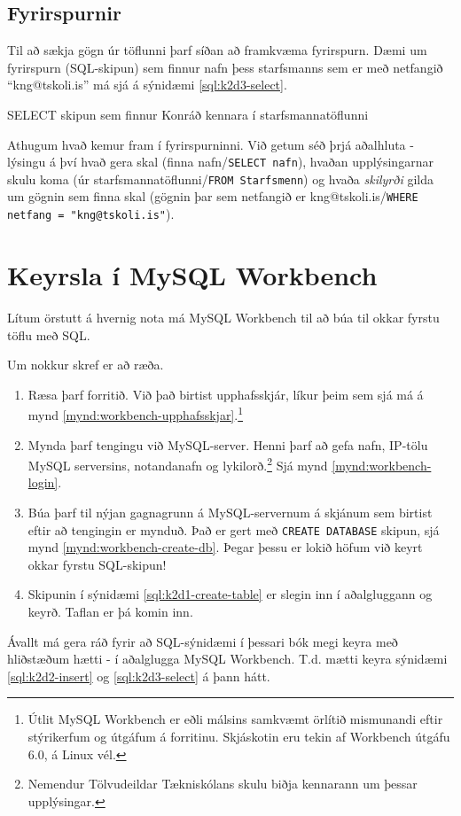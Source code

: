 \subsection{Fyrirspurnir}
Til að sækja gögn úr töflunni þarf síðan að framkvæma fyrirspurn. Dæmi um fyrirspurn (SQL-skipun) sem finnur nafn þess starfsmanns sem er með netfangið ``kng@tskoli.is'' má sjá á sýnidæmi \ref{sql:k2d3-select}.

\begin{example}[h]
\caption{SELECT skipun sem finnur Konráð kennara í starfsmannatöflunni}
\label{sql:k2d3-select}
\centering
{}
\end{example}

Athugum hvað kemur fram í fyrirspurninni. Við getum séð þrjá aðalhluta - lýsingu á því hvað gera skal (finna nafn/\verb|SELECT nafn|), hvaðan upplýsingarnar skulu koma (úr starfsmannatöflunni/\verb|FROM Starfsmenn|) og hvaða \emph{skilyrði} gilda um gögnin sem finna skal (gögnin þar sem netfangið er kng@tskoli.is/\verb|WHERE netfang = "kng@tskoli.is"|). 

\section{Keyrsla í MySQL Workbench}
\label{undirkafli:keyrslaiworkbench}
Lítum örstutt á hvernig nota má MySQL Workbench til að búa til okkar fyrstu töflu með SQL.

Um nokkur skref er að ræða.
\begin{enumerate}
 \item Ræsa þarf forritið. Við það birtist upphafsskjár, líkur þeim sem sjá má á mynd \ref{mynd:workbench-upphafsskjar}.\footnote{Útlit MySQL Workbench er eðli málsins samkvæmt örlítið mismunandi eftir stýrikerfum og útgáfum á forritinu. Skjáskotin eru tekin af Workbench útgáfu 6.0, á Linux vél.}
 \item Mynda þarf tengingu við MySQL-server. Henni þarf að gefa nafn, IP-tölu MySQL serversins, notandanafn og lykilorð.\footnote{Nemendur Tölvudeildar Tækniskólans skulu biðja kennarann um þessar upplýsingar.} Sjá mynd \ref{mynd:workbench-login}.
 \item Búa þarf til nýjan gagnagrunn á MySQL-servernum á skjánum sem birtist eftir að tengingin er mynduð. Það er gert með \verb|CREATE DATABASE| skipun, sjá mynd \ref{mynd:workbench-create-db}. Þegar þessu er lokið höfum við keyrt okkar fyrstu SQL-skipun!
 \item Skipunin í sýnidæmi \ref{sql:k2d1-create-table} er slegin inn í aðalgluggann og keyrð. Taflan er þá komin inn.
\end{enumerate}
Ávallt má gera ráð fyrir að SQL-sýnidæmi í þessari bók megi keyra með hliðstæðum hætti - í aðalglugga MySQL Workbench. T.d. mætti keyra sýnidæmi \ref{sql:k2d2-insert} og \ref{sql:k2d3-select} á þann hátt.

